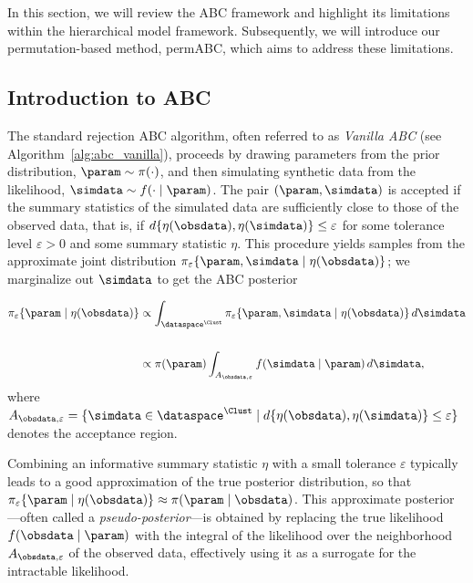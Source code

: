 
In this section, we will review the ABC framework and highlight its limitations within the hierarchical model framework. Subsequently, we will introduce our permutation-based method, permABC, which aims to address these limitations.

\subsection{Introduction to ABC}


The standard rejection ABC algorithm, often referred to as \emph{Vanilla ABC} (see Algorithm~\ref{alg:abc_vanilla}), proceeds by drawing parameters from the prior distribution, $\param \sim \pi(\cdot)$, and then simulating synthetic data from the likelihood, $\simdata \sim f(\cdot \mid \param)$. The pair $(\param, \simdata)$ is accepted if the summary statistics of the simulated data are sufficiently close to those of the observed data, that is, if $d\{\eta(\obsdata), \eta(\simdata)\} \leq \varepsilon$ for some tolerance level $\varepsilon > 0$ and some summary statistic $\eta$. This procedure yields samples from the approximate joint distribution $\pi_{\varepsilon}\{\param,\simdata \mid \eta(\obsdata)\}$; we marginalize out $\simdata$ to get the ABC posterior

\begin{equation}
    \label{eqabc}
    \begin{split}
        \pi_{\varepsilon}\{\param \mid \eta(\obsdata)\} &\propto
        \int_{\dataspace^\Clust} \pi_{\varepsilon}\{\param, \simdata \mid \eta(\obsdata)\} \, d\simdata \\\\
        &\propto \pi(\param) \int_{A_{\obsdata,\varepsilon}} f(\simdata \mid \param) \, d\simdata,
    \end{split}
\end{equation}
where $A_{\obsdata,\varepsilon} = \{\simdata \in \dataspace^\Clust \mid d\{\eta(\obsdata), \eta(\simdata)\} \leq \varepsilon\}$ denotes the acceptance region.

Combining an informative summary statistic $\eta$ with a small tolerance $\varepsilon$ typically leads to a good approximation of the true posterior distribution, so that $\pi_{\varepsilon}\{\param \mid \eta(\obsdata)\} \approx \pi(\param \mid \obsdata)$. This approximate posterior—often called a \emph{pseudo-posterior}—is obtained by replacing the true likelihood $f(\obsdata \mid \param)$ with the integral of the likelihood over the neighborhood $A_{\obsdata,\varepsilon}$ of the observed data, effectively using it as a surrogate for the intractable likelihood.

